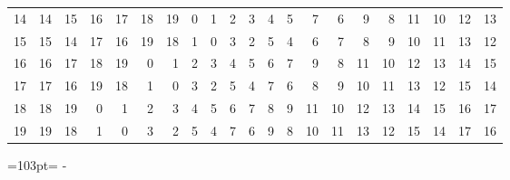 \documentclass[10pt,a4paper]{article}
\newcommand{\needspace}[1]{\par\penalty-100\begingroup\dimen0=#1\relax\dimen2=\pagegoal
  \advance\dimen2-\pagetotal\ifdim\dimen0>\dimen2\relax\ifdim\dimen2>0pt\vfil\break\fi\fi
  \endgroup}
\numberwithin{equation}{section}
\begin{document}
{\begin{longtable}{@{}r|rrrrrrrrrrrrrrrrrrrr@{}}
14 & 14 & 15 & 16 & 17 & 18 & 19 & 0 & 1 & 2 & 3 & 4 & 5 & 7 & 6 & 9 & 8 & 11 & 10 & 12 & 13\\
15 & 15 & 14 & 17 & 16 & 19 & 18 & 1 & 0 & 3 & 2 & 5 & 4 & 6 & 7 & 8 & 9 & 10 & 11 & 13 & 12\\
16 & 16 & 17 & 18 & 19 & 0 & 1 & 2 & 3 & 4 & 5 & 6 & 7 & 9 & 8 & 11 & 10 & 12 & 13 & 14 & 15\\
17 & 17 & 16 & 19 & 18 & 1 & 0 & 3 & 2 & 5 & 4 & 7 & 6 & 8 & 9 & 10 & 11 & 13 & 12 & 15 & 14\\
18 & 18 & 19 & 0 & 1 & 2 & 3 & 4 & 5 & 6 & 7 & 8 & 9 & 11 & 10 & 12 & 13 & 14 & 15 & 16 & 17\\*
19 & 19 & 18 & 1 & 0 & 3 & 2 & 5 & 4 & 7 & 6 & 9 & 8 & 10 & 11 & 13 & 12 & 15 & 14 & 17 & 16\\
\bottomrule\end{longtable}}
\needspace{103pt}
\end{document}
